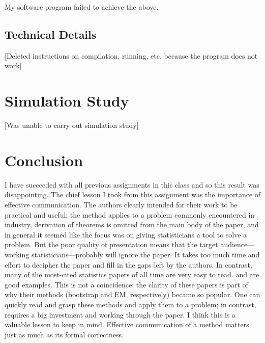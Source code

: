 \documentclass{article}
\begin{document}
My software program failed to achieve the above.

\subsection{Technical Details}

[Deleted instructions on compilation, running, etc. because the program does
not work]

\section{Simulation Study}

[Was unable to carry out simulation study]

\section{Conclusion}

I have succeeded with all previous assignments in this class and so this
result was disappointing. The chief lesson I took from this assignment was the
importance of effective communication. The authors clearly intended for their
work to be practical and useful: the method applies to a problem commonly
encountered in industry, derivation of theorems is omitted from the main body of
the paper, and in general it seemed like the focus was on giving statisticians a
tool to solve a problem. But the poor quality of presentation means that the
target audience---working statisticians---probably will ignore the paper. It
takes too much time and effort to decipher the paper and fill in the gaps left
by the authors. In contrast, many of the most-cited statistics papers of all
time are very easy to read. \cite{bootstrap} and \cite{dempster1977maximum} are
good examples. This is not a coincidence: the clarity of these papers is part of
why their methods (bootstrap and EM, respectively) became so popular. One can
quickly read and grasp these methods and apply them to a problem; in contrast, \cite{igeta2018}
requires a big investment and working through the paper. I think
this is a valuable lesson to keep in mind. Effective communication of a method
matters just as much as its formal correctness.

\printbibliography[heading=bibnumbered]
\end{document}

